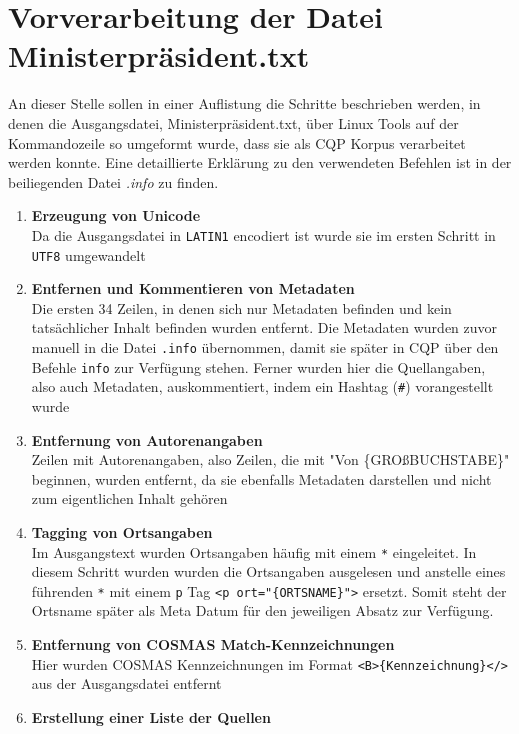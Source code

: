 \documentclass[%
	type=document,%
  	style=article,%
  	media=print,
  	pages=oneside,%
  	prefixLecturer=Dozenten:,
  	author=multiple,
]{unihildesheim} %
\begin{document}
\Titlepage
\cleardoublepage
\TOC
\cleardoublepage

%

\section{Vorverarbeitung der Datei Ministerpräsident.txt}
An dieser Stelle sollen in einer Auflistung die Schritte beschrieben werden,
in denen die Ausgangsdatei, Ministerpräsident.txt, über Linux Tools auf der
Kommandozeile so umgeformt wurde, dass sie als CQP Korpus verarbeitet werden
konnte. Eine detaillierte Erklärung zu den verwendeten Befehlen ist in der
beiliegenden Datei \textit{.info} zu finden.
\begin{enumerate}
  \item \textbf{Erzeugung von Unicode}
  \\Da die Ausgangsdatei in \texttt{LATIN1} encodiert ist
  wurde sie im ersten Schritt in \texttt{UTF8} umgewandelt
  \item \textbf{Entfernen und Kommentieren von Metadaten}
   \\Die ersten 34 Zeilen, in denen sich nur Metadaten befinden und kein
  tatsächlicher Inhalt befinden wurden entfernt. Die Metadaten wurden zuvor
  manuell in die Datei \texttt{.info} übernommen, damit sie später in CQP über
  den Befehle \texttt{info} zur Verfügung stehen. Ferner wurden hier die
  Quellangaben, also auch Metadaten, auskommentiert, indem ein Hashtag
  (\texttt{\#}) vorangestellt wurde
  \item \textbf{Entfernung von Autorenangaben}
  \\ Zeilen mit Autorenangaben, also Zeilen, die mit "Von \{GROßBUCHSTABE\}"
  beginnen, wurden entfernt, da sie ebenfalls Metadaten darstellen und nicht zum
  eigentlichen Inhalt gehören
  \item \textbf{Tagging von Ortsangaben}
  \\ Im Ausgangstext wurden Ortsangaben häufig mit einem \texttt{*} eingeleitet.
  In diesem Schritt wurden wurden die Ortsangaben ausgelesen und anstelle eines
  führenden \texttt{*} mit einem \texttt{p} Tag \texttt{<p
  ort="\{ORTSNAME\}">} ersetzt.
  Somit steht der Ortsname später als Meta Datum für den jeweiligen Absatz zur Verfügung.
  \item \textbf{Entfernung von COSMAS Match-Kennzeichnungen}
  \\ Hier wurden COSMAS Kennzeichnungen im Format
  \texttt{<B>\{Kennzeichnung\}</>} aus der Ausgangsdatei entfernt
  \item \textbf{Erstellung einer Liste der Quellen}

\end{enumerate}
\end{document}
